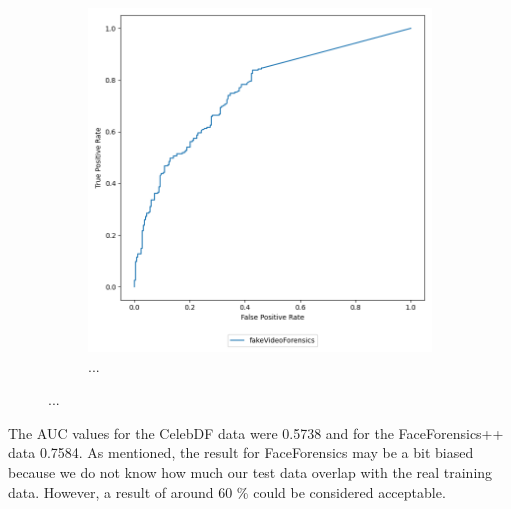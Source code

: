 \begin{figure}[H]
\begin{subfigure}[h]{0.5\linewidth}
        \includegraphics[width=1\linewidth]{other-fig/tests/ff_methods.png}
        \caption{...}
    \end{subfigure}
    \caption{...}
\end{figure}

The AUC values for the CelebDF data were 0.5738 and for the FaceForensics++ data 0.7584. As mentioned, the result for FaceForensics may be a bit biased because we do not know how much our test data overlap with the real training data. However, a result of around 60 \% could be considered acceptable.


